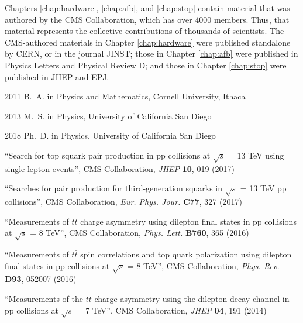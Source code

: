 \begin{frontmatter}
\begin{acknowledgements}
Chapters \ref{chap:hardware}, \ref{chap:afb}, and \ref{chap:stop}
contain material that was authored by the CMS Collaboration, which has
over 4000 members. Thus, that material represents the collective
contributions of thousands of scientists.
The CMS-authored materials in Chapter \ref{chap:hardware} were
published standalone by CERN, or in the journal JINST; those in
Chapter \ref{chap:afb} were published in Physics Letters and Physical
Review D; and those in Chapter \ref{chap:stop} were published in JHEP
and EPJ.
\end{acknowledgements}


%
%
\begin{vitapage}
\begin{vita}
  \item[2011] B.~A. in Physics and Mathematics, Cornell University, Ithaca
  \item[2013] M.~S. in Physics, University of California San Diego
  \item[2018] Ph.~D. in Physics, University of California San Diego
\end{vita}
\begin{publications}
  \item ``Search for top squark pair production in pp collisions at $\sqrt{s}$ = 13 TeV using single lepton events'', CMS Collaboration, \emph{JHEP} \textbf{10}, 019 (2017) %
  \item ``Searches for pair production for third-generation squarks in $\sqrt{s}$ = 13 TeV pp collisions'', CMS Collaboration, \emph{Eur. Phys. Jour.} \textbf{C77}, 327 (2017) %
  \item ``Measurements of $t\bar{t}$ charge asymmetry using dilepton final states in pp collisions at $\sqrt{s}$ = 8 TeV'', CMS Collaboration, \emph{Phys. Lett.} \textbf{B760}, 365 (2016) %
  \item ``Measurements of $t\bar{t}$ spin correlations and top quark polarization using dilepton final states in pp collisions at $\sqrt{s}$ = 8 TeV'', CMS Collaboration, \emph{Phys. Rev.} \textbf{D93}, 052007 (2016) %
  \item ``Measurements of the $t\bar{t}$ charge asymmetry using the dilepton decay channel in pp collisions at $\sqrt{s}$ = 7 TeV'', CMS Collaboration, \emph{JHEP} \textbf{04}, 191 (2014) %
\end{publications}
\end{vitapage}



\end{frontmatter}
